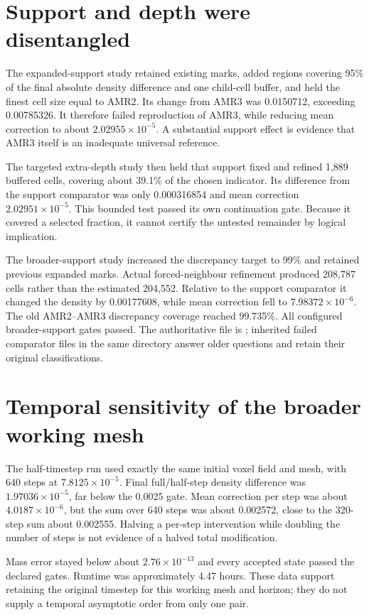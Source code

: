 \section{Support and depth were disentangled}
The expanded-support study retained existing marks, added regions covering 95\% of the final absolute density difference and one child-cell buffer, and held the finest cell size equal to AMR2. Its change from AMR3 was 0.0150712, exceeding 0.00785326. It therefore failed reproduction of AMR3, while reducing mean correction to about $2.02955\times10^{-5}$. A substantial support effect is evidence that AMR3 itself is an inadequate universal reference.

The targeted extra-depth study then held that support fixed and refined 1,889 buffered cells, covering about 39.1\% of the chosen indicator. Its difference from the support comparator was only 0.000316854 and mean correction $2.02951\times10^{-5}$. This bounded test passed its own continuation gate. Because it covered a selected fraction, it cannot certify the untested remainder by logical implication.

The broader-support study increased the discrepancy target to 99\% and retained previous expanded marks. Actual forced-neighbour refinement produced 208,787 cells rather than the estimated 204,552. Relative to the support comparator it changed the density by 0.00177608, while mean correction fell to $7.98372\times10^{-6}$. The old AMR2--AMR3 discrepancy coverage reached 99.735\%. All configured broader-support gates passed. The authoritative file is ; inherited failed comparator files in the same directory answer older questions and retain their original classifications.

\section{Temporal sensitivity of the broader working mesh}
The half-timestep run used exactly the same initial voxel field and mesh, with 640 steps at $7.8125\times10^{-5}$. Final full/half-step density difference was $1.97036\times10^{-5}$, far below the 0.0025 gate. Mean correction per step was about $4.0187\times10^{-6}$, but the sum over 640 steps was about 0.002572, close to the 320-step sum about 0.002555. Halving a per-step intervention while doubling the number of steps is not evidence of a halved total modification.

Mass error stayed below about $2.76\times10^{-13}$ and every accepted state passed the declared gates. Runtime was approximately 4.47 hours. These data support retaining the original timestep for this working mesh and horizon; they do not supply a temporal asymptotic order from only one pair.

